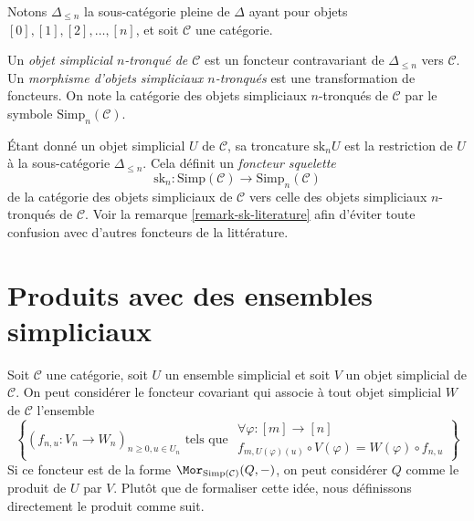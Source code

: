 \noindent
Notons $\Delta_{\leq n}$ la sous-catégorie pleine de $\Delta$ ayant pour
objets $[0], [1], [2], \ldots, [n]$, et soit $\mathcal{C}$ une catégorie.

\begin{definition}
\label{definition-truncated-simplicial-object}
Un {\it objet simplicial $n$-tronqué de $\mathcal{C}$} est un foncteur
contravariant de $\Delta_{\leq n}$ vers $\mathcal{C}$. Un
{\it morphisme d'objets simpliciaux $n$-tronqués} est une transformation
de foncteurs. On note la catégorie des objets simpliciaux $n$-tronqués de
$\mathcal{C}$ par le symbole $\text{Simp}_n(\mathcal{C})$.
\end{definition}

\noindent
Étant donné un objet simplicial $U$ de $\mathcal{C}$, sa troncature
$\text{sk}_n U$ est la restriction de $U$ à la sous-catégorie
$\Delta_{\leq n}$. Cela définit un {\it foncteur squelette}
$$
\text{sk}_n :
\text{Simp}(\mathcal{C}) \longrightarrow \text{Simp}_n(\mathcal{C})
$$
de la catégorie des objets simpliciaux de $\mathcal{C}$ vers celle des
objets simpliciaux $n$-tronqués de $\mathcal{C}$. Voir la remarque
\ref{remark-sk-literature} afin d'éviter toute confusion avec d'autres
foncteurs de la littérature.




\section{Produits avec des ensembles simpliciaux}
\label{section-product-with-simplicial-sets}

\noindent
Soit $\mathcal{C}$ une catégorie, soit $U$ un ensemble simplicial et soit
$V$ un objet simplicial de $\mathcal{C}$. On peut considérer le foncteur
covariant qui associe à tout objet simplicial $W$ de $\mathcal{C}$
l'ensemble
\begin{equation}
\label{equation-functor-product-with-simplicial-set}
\left\{
(f_{n, u} : V_n \to W_n)_{n \geq 0, u \in U_n}
\text{ tels que }
\begin{matrix}
\forall \varphi : [m] \to [n] \\
f_{m, U(\varphi)(u)} \circ V(\varphi) = W(\varphi) \circ f_{n, u}
\end{matrix}
\right\}
\end{equation}
Si ce foncteur est de la forme $\Mor_{\text{Simp}(\mathcal{C})}(Q, -)$,
on peut considérer $Q$ comme le produit de $U$ par $V$. Plutôt que de
formaliser cette idée, nous définissons directement le produit comme suit.

